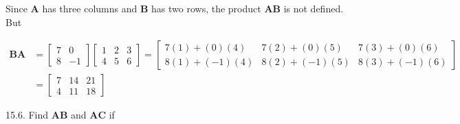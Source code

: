 \documentclass[10pt]{article}
\begin{document}
Since $\mathbf{A}$ has three columns and $\mathbf{B}$ has two rows, the product $\mathbf{A B}$ is not defined. But

$$
\begin{aligned}
\mathbf{B A} & =\left[\begin{array}{rr}
7 & 0 \\
8 & -1
\end{array}\right]\left[\begin{array}{lll}
1 & 2 & 3 \\
4 & 5 & 6
\end{array}\right]=\left[\begin{array}{ccc}
7(1)+(0)(4) & 7(2)+(0)(5) & 7(3)+(0)(6) \\
8(1)+(-1)(4) & 8(2)+(-1)(5) & 8(3)+(-1)(6)
\end{array}\right] \\
& =\left[\begin{array}{lll}
7 & 14 & 21 \\
4 & 11 & 18
\end{array}\right]
\end{aligned}
$$

15.6. Find $\mathbf{A B}$ and $\mathbf{A C}$ if
\end{document}

